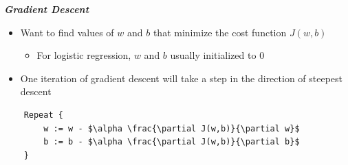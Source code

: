 \documentclass[12pt, letterpaper]{article}
\begin{document}
    \vspace{3mm}
    \textbf{\textit{Gradient Descent}}
    \begin{itemize}
        \item Want to find values of $w$ and $b$ that minimize the cost function $J(w,b)$
        \begin{itemize}
            \item For logistic regression, $w$ and $b$ usually initialized to 0
        \end{itemize} 
        \item One iteration of gradient descent will take a step in the direction of steepest descent
    \end{itemize}

    \vspace{3mm}
    \begin{lstlisting}
    Repeat {
        w := w - $\alpha \frac{\partial J(w,b)}{\partial w}$
        b := b - $\alpha \frac{\partial J(w,b)}{\partial b}$
    }  
    \end{lstlisting}
\end{document}
